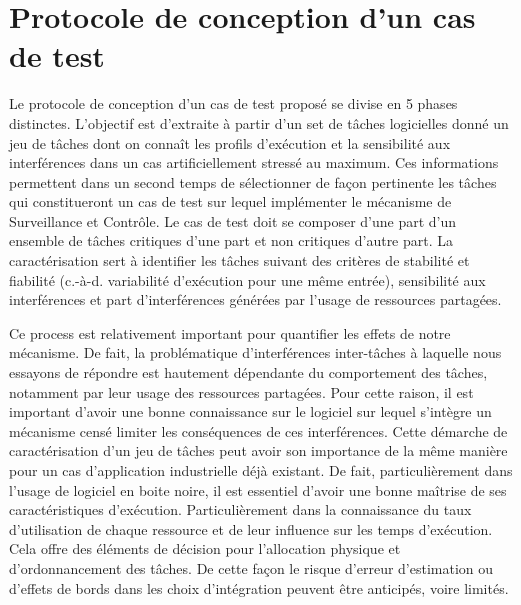 \documentclass[french, a4paper, 11pt, twoside, pdftex]{StyleThese}
\begin{document}
        \section{Protocole de conception d'un cas de test}
        
        Le protocole de conception d'un cas de test proposé se divise en 5 phases distinctes. L'objectif est d'extraite à partir d'un set de tâches logicielles donné un jeu de tâches dont on connaît les profils d'exécution et la sensibilité aux interférences dans un cas artificiellement stressé au maximum. Ces informations permettent dans un second temps de sélectionner de façon pertinente les tâches qui constitueront un cas de test sur lequel implémenter le mécanisme de Surveillance et Contrôle. Le cas de test doit se composer d'une part d'un ensemble de tâches critiques d'une part et non critiques d'autre part. La caractérisation sert à identifier les tâches suivant des critères de stabilité et fiabilité (c.-à-d. variabilité d'exécution pour une même entrée), sensibilité aux interférences et part d'interférences générées par l'usage de ressources partagées.
        
        Ce process est relativement important pour quantifier les effets de notre mécanisme. De fait, la problématique d'interférences inter-tâches à laquelle nous essayons de répondre est hautement dépendante du comportement des tâches, notamment par leur usage des ressources partagées. Pour cette raison, il est important d'avoir une bonne connaissance sur le logiciel sur lequel s'intègre un mécanisme censé limiter les conséquences de ces interférences. Cette démarche de caractérisation d'un jeu de tâches peut avoir son importance de la même manière pour un cas d'application industrielle déjà existant. De fait, particulièrement dans l'usage de logiciel en boite noire, il est essentiel d'avoir une bonne maîtrise de ses caractéristiques d'exécution. Particulièrement dans la connaissance du taux d'utilisation de chaque ressource et de leur influence sur les temps d'exécution. Cela offre des éléments de décision pour l'allocation physique et d'ordonnancement des tâches. De cette façon le risque d'erreur d'estimation ou d'effets de bords dans les choix d'intégration peuvent être anticipés, voire limités.
        
\end{document}
